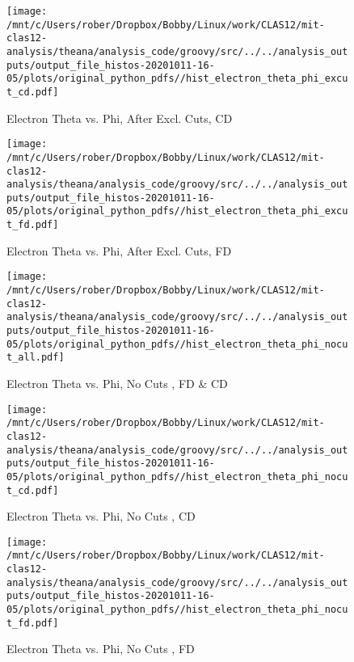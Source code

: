 \documentclass{article}
\begin{document}
\begin{landscape}
\begin{figure}[h]
        \texttt{[image: /mnt/c/Users/rober/Dropbox/Bobby/Linux/work/CLAS12/mit-clas12-analysis/theana/analysis\_code/groovy/src/../../analysis\_outputs/output\_file\_histos-20201011-16-05/plots/original\_python\_pdfs//hist\_electron\_theta\_phi\_excut\_cd.pdf]}
        \captionsetup{textformat=empty,labelformat=blank}
        \caption{Electron Theta vs. Phi, After Excl. Cuts, CD}
    \end{figure}
    \clearpage
    
    \begin{figure}[h]
        \centering

        \texttt{[image: /mnt/c/Users/rober/Dropbox/Bobby/Linux/work/CLAS12/mit-clas12-analysis/theana/analysis\_code/groovy/src/../../analysis\_outputs/output\_file\_histos-20201011-16-05/plots/original\_python\_pdfs//hist\_electron\_theta\_phi\_excut\_fd.pdf]}
        \captionsetup{textformat=empty,labelformat=blank}
        \caption{Electron Theta vs. Phi, After Excl. Cuts, FD}
    \end{figure}
    \clearpage
    
    \begin{figure}[h]
        \centering

        \texttt{[image: /mnt/c/Users/rober/Dropbox/Bobby/Linux/work/CLAS12/mit-clas12-analysis/theana/analysis\_code/groovy/src/../../analysis\_outputs/output\_file\_histos-20201011-16-05/plots/original\_python\_pdfs//hist\_electron\_theta\_phi\_nocut\_all.pdf]}
        \captionsetup{textformat=empty,labelformat=blank}
        \caption{Electron Theta vs. Phi, No Cuts , FD \& CD}
    \end{figure}
    \clearpage
    
    \begin{figure}[h]
        \centering

        \texttt{[image: /mnt/c/Users/rober/Dropbox/Bobby/Linux/work/CLAS12/mit-clas12-analysis/theana/analysis\_code/groovy/src/../../analysis\_outputs/output\_file\_histos-20201011-16-05/plots/original\_python\_pdfs//hist\_electron\_theta\_phi\_nocut\_cd.pdf]}
        \captionsetup{textformat=empty,labelformat=blank}
        \caption{Electron Theta vs. Phi, No Cuts , CD}
    \end{figure}
    \clearpage
    
    \begin{figure}[h]
        \centering

        \texttt{[image: /mnt/c/Users/rober/Dropbox/Bobby/Linux/work/CLAS12/mit-clas12-analysis/theana/analysis\_code/groovy/src/../../analysis\_outputs/output\_file\_histos-20201011-16-05/plots/original\_python\_pdfs//hist\_electron\_theta\_phi\_nocut\_fd.pdf]}
        \captionsetup{textformat=empty,labelformat=blank}
        \caption{Electron Theta vs. Phi, No Cuts , FD}
    \end{figure}
    \clearpage
    

\end{landscape}
\end{document}
